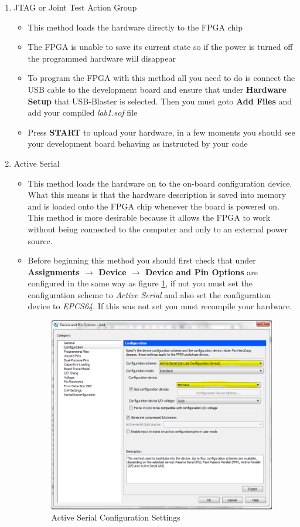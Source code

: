 \begin{enumerate}

\item JTAG or Joint Test Action Group

	\begin{itemize}
	\item This method loads the hardware directly to the FPGA chip
	\item The FPGA is unable to save its current state so if the power is turned off the programmed hardware will disappear
	\item To program the FPGA with this method all you need to do is connect the USB cable to the development board and ensure that under {\bf Hardware Setup} that USB-Blaster is selected. Then you must goto {\bf Add Files} and add your compiled \emph{lab1.sof} file
	\item Press {\bf START} to upload your hardware, in a few moments you should see your development board behaving as instructed by your code
	\end{itemize}

\item Active Serial

	\begin{itemize}
	\item This method loads the hardware on to the on-board configuration device. What this means is that the hardware description is saved into memory and is loaded onto the FPGA chip whenever the board is powered on. This method is more desirable because it allows the FPGA to work without being connected to the computer and only to an external power source.
	\item Before beginning this method you should first check that under {\bf Assignments $\rightarrow$ Device $\rightarrow$ Device and Pin Options} are configured in the same way as figure \ref{fig:activeserialconfig}, if not you must set the configuration scheme to \emph{Active Serial} and also set  the configuration device to \emph{EPCS64}. If this was not set you must recompile your hardware.

	\begin{figure}[H]
	\centering
	\includegraphics[width=100mm]{Lab1/figures/activeserialconfig.png}
	\caption{Active Serial Configuration Settings}
	\label{fig:activeserialconfig}
	\end{figure}


\end{itemize}
\end{enumerate}
